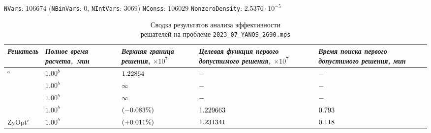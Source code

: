 \documentclass[%
	11pt,
	a4paper,
	utf8,
		]{article}
\begin{document}
\def\nVarsA{106674}
\def\nBinVarsA{0}
\def\nIntVarsA{3069}
\def\nConssA{106029}

\def\firstSolHighsObjA{1.2296637}  %
\def\firstSolHighsTimeA{47.6 / 60}
\def\firstSolZyoptObjA{1.2313417}  %
\def\firstSolZyoptTimeA{7.1 / 60}

\newcommand{\cplexObjA}{1.228640082}  %
\newcommand{\zyoptObjA}{1.2285012}  %
\newcommand{\highsObjA}{1.2296637}  %
\newcommand{\cplexZyoptObjRelA}{(\fpeval{\cplexObjA} - \fpeval{\zyoptObjA}) / \fpeval{\cplexObjA} * 100}
\newcommand{\cplexHighsObjRelA}{(\fpeval{\cplexObjA} - \fpeval{\highsObjA}) / \fpeval{\cplexObjA} * 100}

\vspace*{-20mm}
{%
	\begin{table}[!h]
		\centering
		\caption{Сводка результатов анализа эффективности \\решателей на проблеме \texttt{2023\_07\_YANOS\_2690.mps}}
		
		{\footnotesize \texttt{NVars}: $ \nVarsA $ (\texttt{NBinVars}: $ \nBinVarsA $,  \texttt{NIntVars}: $ \nIntVarsA $) \texttt{NConss}: $ \nConssA $ \texttt{NonzeroDensity}: $ 2.5376 \cdot 10^{-5} $}\\[2mm]

		\begin{tabular}{ p{2.9cm} | p{2.5cm} p{3.4cm} p{3.6cm} p{3.2cm} }
			\rowcolor{black!5}\emph{Решатель} & \emph{Полное время \mbox{расчета, мин}} & \emph{Верхняя граница} \mbox{\itshape решения}, $ \times 10^{7} $ & \emph{Целевая функция первого допустимого решения, $ \times 10^7 $} & \emph{Время поиска первого допустимого решения, мин} \\
			\hline
			\rowcolor{blue!3}{CPLEX 12.8.0.0}$ ^a $ & $ 1.00^b $ & $ \fpeval{trunc(\cplexObjA, 6)} $ & $ - $ & $ - $ \\
			\rowcolor{black!5}{CBC} & $ 1.00^b $ & $ \infty $ & $ - $ & $ - $ \\
			\rowcolor{blue!3}{SCIP 8.0.3} & $ 1.00^b $ & $ \infty $ & $ - $ & $ - $ \\
			\rowcolor{black!5}{HiGHS 1.5.3} & $ 1.00^b $ & \ccb{$ \ccb{\fpeval{trunc(\highsObjA, 6)}} $} $ (\fpeval{trunc(\cplexHighsObjRelA, 3)}\%) $ & $ \fpeval{trunc(\firstSolHighsObjA, 6)} $ & $ \fpeval{trunc(\firstSolHighsTimeA, 3)} $ \\
			\rowcolor{blue!3}ZyOpt$^c$ & $ 1.00^b $  & \ccg{$ \fpeval{trunc(\zyoptObjA, 6)} $} $ (+\fpeval{trunc(\cplexZyoptObjRelA, 3)}\%) $ & $ \fpeval{trunc(\firstSolZyoptObjA, 6)} $ & $ \fpeval{trunc(\firstSolZyoptTimeA, 3)} $ \\
		\end{tabular}
	

\end{table}}
\end{document}
